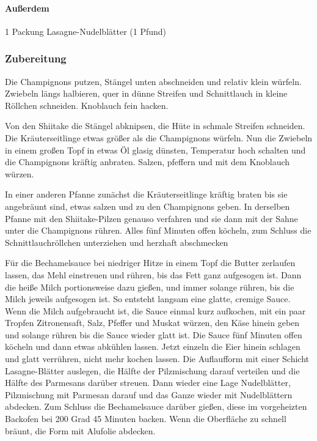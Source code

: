 \paragraph*{Außerdem}

1 Packung Lasagne-Nudelblätter (1 Pfund)

\subsubsection*{Zubereitung}

Die Champignons putzen, Stängel unten abschneiden und relativ klein würfeln. Zwiebeln längs halbieren, quer in dünne Streifen und Schnittlauch in kleine Röllchen schneiden. Knoblauch fein hacken.

Von den Shiitake die Stängel abknipsen, die Hüte in schmale Streifen schneiden. Die Kräuterseitlinge etwas größer als die Champignons würfeln.
Nun die Zwiebeln in einem großen Topf in etwas Öl glasig dünsten, Temperatur hoch schalten und die Champignons kräftig anbraten. Salzen, pfeffern und mit dem Knoblauch würzen.

In einer anderen Pfanne zunächst die Kräuterseitlinge kräftig braten bis sie angebräunt sind, etwas salzen und zu den Champignons geben. In derselben Pfanne mit den Shiitake-Pilzen genauso verfahren und sie dann mit der Sahne unter die Champignons rühren. Alles fünf Minuten offen köcheln, zum Schluss die Schnittlauchröllchen unterziehen und herzhaft abschmecken

Für die Bechamelsauce bei niedriger Hitze in einem Topf die Butter zerlaufen lassen, das Mehl einstreuen und rühren, bis das Fett ganz aufgesogen ist. Dann die heiße Milch portionsweise dazu gießen, und immer solange rühren, bis die Milch jeweils aufgesogen ist. So entsteht langsam eine glatte, cremige Sauce. Wenn die Milch aufgebraucht ist, die Sauce einmal kurz aufkochen, mit ein paar Tropfen Zitronensaft, Salz, Pfeffer und Muskat würzen, den Käse hinein geben  und solange rühren bis die Sauce wieder glatt ist. Die Sauce fünf Minuten offen köcheln und dann etwas abkühlen lassen. Jetzt einzeln die 
Eier hinein schlagen und glatt verrühren, nicht mehr kochen lassen.
Die Auflaufform mit einer Schicht Lasagne-Blätter auslegen, die Hälfte der Pilzmischung darauf verteilen und die Hälfte des Parmesans darüber streuen. Dann wieder eine Lage Nudelblätter, Pilzmischung mit Parmesan darauf und das Ganze wieder mit Nudelblättern abdecken. Zum Schluss die Bechamelsauce darüber gießen, diese im vorgeheizten Backofen bei 200 Grad 45 Minuten backen. Wenn die Oberfläche zu schnell bräunt, die Form mit Alufolie abdecken.

